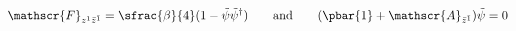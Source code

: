 \begin{equation}\label{ncveqn}
 \mathscr{F}_{z^1\bar{z}^{\bar{1}}}
 =\sfrac{\beta}{4}(1-\tilde{\psi}\tilde{\psi}^\dagger)
 \qquad\text{and}\qquad
 (\pbar{1}+\mathscr{A}_{\bar{z}^{\bar{1}}})\tilde{\psi}=0
\end{equation}

